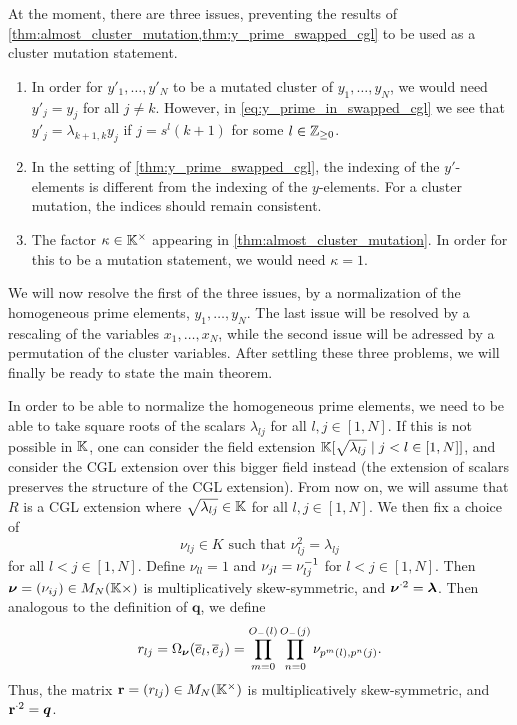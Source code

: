 At the moment, there are three issues, preventing the results of
\cref{thm:almost_cluster_mutation,thm:y_prime_swapped_cgl} to be used as a cluster
mutation statement.

\begin{enumerate}
	\item In order for $y'_1, \dots, y'_N$ to be a mutated cluster of $y_1, \dots, y_N$, we would
	      need $y'_j = y_j$ for all $j \neq k$. However, in \cref{eq:y_prime_in_swapped_cgl} we
	      see that $y'_j = \lambda_{k+1,k}y_j$ if $j = s^l(k+1)$ for some $l \in \mathbb{Z}_{\geq 0}$.
	\item In the setting of \cref{thm:y_prime_swapped_cgl}, the indexing of the $y'$-elements is
	      different from the indexing of the $y$-elements. For a cluster mutation, the indices
	      should remain consistent.
	\item The factor $\kappa \in \mathbb{K}^\times$ appearing in \cref{thm:almost_cluster_mutation}. In
	      order for this to be a mutation statement, we would need $\kappa = 1$.
\end{enumerate}

We will now resolve the first of the three issues, by a normalization of the
homogeneous prime elements, $y_1, \dots, y_N$. The last issue will be resolved by a
rescaling of the variables $x_1, \dots, x_N$, while the second issue will be adressed
by a permutation of the cluster variables. After settling these three problems, we will
finally be ready to state the main theorem.

In order to be able to normalize the homogeneous prime elements, we need to be able to
take square roots of the scalars $\lambda_{lj}$ for all $l,j \in [1, N]$. If this is
not possible in $\mathbb{K}$, one can consider the field extension $\mathbb{K}[\sqrt{\lambda_{lj}}
		\mid j < l \in [1, N]]$, and consider the CGL extension over this bigger field instead
(the extension of scalars preserves the structure of the CGL extension). From now on,
we will assume that $R$ is a CGL extension where $\sqrt{\lambda_{lj}} \in \mathbb{K}$ for all
$l, j \in [1, N]$. We then fix a choice of
\begin{equation*}
	\nu_{lj} \in K \text{ such that } \nu^2_{lj} = \lambda_{lj}
\end{equation*}
%
for all $l < j \in [1, N]$. Define $\nu_{ll} = 1$ and $\nu_{jl} = \nu_{lj}^{-1}$ for $l
	< j \in [1, N]$. Then $\boldsymbol{\nu} = (\nu_{ij}) \in M_N(\mathbb{K}\times)$ is multiplicatively
skew-symmetric, and $\boldsymbol{\nu}^{\cdot 2} = \boldsymbol{\lambda}$. Then analogous to the
definition of $\mathbf{q}$, we define
\begin{equation*}
	r_{lj} = \Omega_{\boldsymbol{\nu}}(\overline{e}_l, \overline{e}_j) = \prod_{m=0}^{O_{-}(l)}\prod_{n=0}^{O_{-}(j)}\nu_{p^m(l), p^n(j)}.
\end{equation*}
%
Thus, the matrix $\mathbf{r} = (r_{lj}) \in M_N(\mathbb{K}^\times)$ is multiplicatively
skew-symmetric, and $\mathbf{r}^{\cdot 2} = \boldsymbol{q}$.


